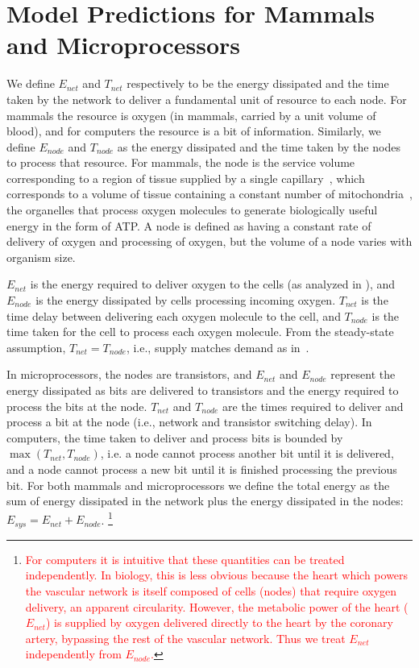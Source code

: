 \documentclass[12pt]{article}
\newcommand{\red}[1]{\textcolor{red}{#1}}
\begin{document}
\section{Model Predictions for Mammals and Microprocessors}

We define $E_{net}$ and $T_{net}$ respectively to be the energy dissipated and
the time taken by the network to deliver a fundamental unit of resource to each node.  For
mammals the resource is oxygen (in mammals, carried by a unit volume of
blood), and for computers the resource is a bit of information.
Similarly, we define $E_{node}$ and $T_{node}$ as the energy dissipated and the
time taken by the nodes to process that resource.  For mammals, the node is
the service volume corresponding to a region of tissue supplied by a single
capillary~\cite{banavar10}, which corresponds to a volume of tissue containing a constant number
of mitochondria~\cite{west2002allometric}, the organelles that process oxygen molecules to generate
biologically useful energy in the form of ATP. A node is defined as having a constant
rate of delivery of oxygen and processing of oxygen, but the
volume of a node varies with organism size. 

$E_{net}$ is the energy required to deliver oxygen to the cells (as analyzed in
\cite{west97}), and $E_{node}$ is the energy dissipated by cells processing
incoming oxygen. $T_{net}$ is the time delay between delivering
each oxygen molecule to the cell, and $T_{node}$ is the time taken
for the cell to process each oxygen molecule. From the steady-state assumption, $T_{net} = T_{node}$,
i.e., supply matches demand as in~\cite{banavar10}.

In microprocessors, the nodes are transistors, and 
$E_{net}$ and $E_{node}$ represent the energy dissipated as bits are delivered
to transistors and the energy required to process the bits at the node.
$T_{net}$ and $T_{node}$ are the times required to deliver and process a bit at
the node (i.e., network and transistor switching delay).  In computers, the time
taken to deliver and process bits is bounded by $\max(T_{net},T_{node})$, i.e. a node cannot process another
bit until it is delivered, and a node cannot process a new bit until it is finished
processing the previous bit. For
both mammals and microprocessors we define the total energy as the sum of energy
dissipated in the network plus the energy dissipated in the nodes: $E_{sys} =
E_{net} + E_{node}$.  \footnote{\red{For computers it is intuitive that these quantities can be treated independently. In biology, this is less obvious because the heart which powers the vascular network is itself composed of cells (nodes) that require oxygen delivery, an apparent circularity. However, the metabolic power of the heart ($E_{net}$) is supplied by oxygen delivered directly to the heart by the coronary artery, bypassing the rest of the vascular network. Thus we treat $E_{net}$ independently from $E_{node}$.}}
\end{document}
